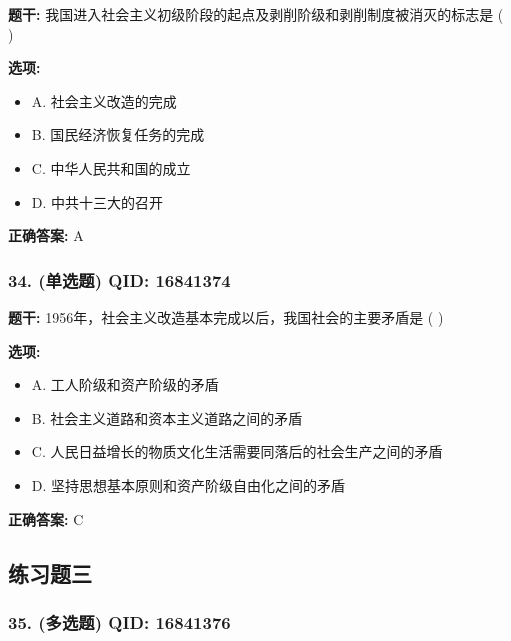 \documentclass[12pt,UTF8]{ctexart}
\begin{document}
\textbf{题干:}
我国进入社会主义初级阶段的起点及剥削阶级和剥削制度被消灭的标志是 ( )

\textbf{选项:}
\begin{itemize}[leftmargin=*]

  \item A. 社会主义改造的完成

  \item B. 国民经济恢复任务的完成

  \item C. 中华人民共和国的成立

  \item D. 中共十三大的召开

\end{itemize}

\textbf{正确答案:}
A

\vspace{0.3em}\hrulefill\vspace{0.7em}

\subsubsection*{34. (单选题) \small QID: 16841374}

\textbf{题干:}
1956年，社会主义改造基本完成以后，我国社会的主要矛盾是 ( )

\textbf{选项:}
\begin{itemize}[leftmargin=*]

  \item A. 工人阶级和资产阶级的矛盾

  \item B. 社会主义道路和资本主义道路之间的矛盾

  \item C. 人民日益增长的物质文化生活需要同落后的社会生产之间的矛盾

  \item D. 坚持思想基本原则和资产阶级自由化之间的矛盾

\end{itemize}

\textbf{正确答案:}
C

\vspace{0.3em}\hrulefill\vspace{0.7em}

\subsection*{练习题三}

\subsubsection*{35. (多选题) \small QID: 16841376}
\end{document}
